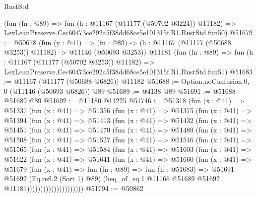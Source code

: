 \begin{lexlean}{RustStd}
\begin{coremodule}
    (fun (fn : @89) =>
    fun (h : @11167 (@11177 (@50702 @3224)) @11182) =>
    LexLeanPreserve.Cec60473ce292a5f38dd68ce5e101315f.R1.RustStd.fun50)
@51679 := @50678
    (fun (y : @41) =>
    (fn : @89) -> (h : @11167 (@11177 (@50688 @3253)) @11182) -> @11146 (@50693 @3253))
    @11181
    (fun (fn : @89) =>
    fun (h : @11167 (@11177 (@50702 @3253)) @11182) =>
    LexLeanPreserve.Cec60473ce292a5f38dd68ce5e101315f.R1.RustStd.fun51)
@51683 := @11167 (@11177 (@50688 @6826)) @11182
@51688 := Option.noConfusion.{0, 0} (@11146 (@50693 @6826)) @89
@51689 := @4138 @89
@51691 := @51688 @51689 @89
@51692 := @11180 @11225
@51746 := @51318
    (fun (x : @41) =>
    @51337
      (fun (x : @41) =>
      @51356
        (fun (x : @41) =>
        @51375
          (fun (x : @41) =>
          @51394
            (fun (x : @41) =>
            @51413
              (fun (x : @41) =>
              @51432
                (fun (x : @41) =>
                @51451
                  (fun (x : @41) =>
                  @51470
                    (fun (x : @41) =>
                    @51489
                      (fun (x : @41) =>
                      @51508
                        (fun (x : @41) =>
                        @51527
                          (fun (x : @41) =>
                          @51546
                            (fun (x : @41) =>
                            @51565
                              (fun (x : @41) =>
                              @51584
                                (fun (x : @41) =>
                                @51603
                                  (fun (x : @41) =>
                                  @51622
                                    (fun (x : @41) =>
                                    @51641
                                      (fun (x : @41) =>
                                      @51660
                                        (fun (x : @41) =>
                                        @51679
                                          (fun (x : @41) =>
                                          fun (fn : @89) =>
                                          fun (h : @51683) =>
                                          @51691
                                            @51692
                                            (Eq.refl.{2} (Sort 1) @89)
                                            (heq_of_eq.{1}
                                              @11166
                                              @51689
                                              @51692
                                              @11181)))))))))))))))))))))
@51794 := @50862

\end{coremodule}
\end{lexlean}
